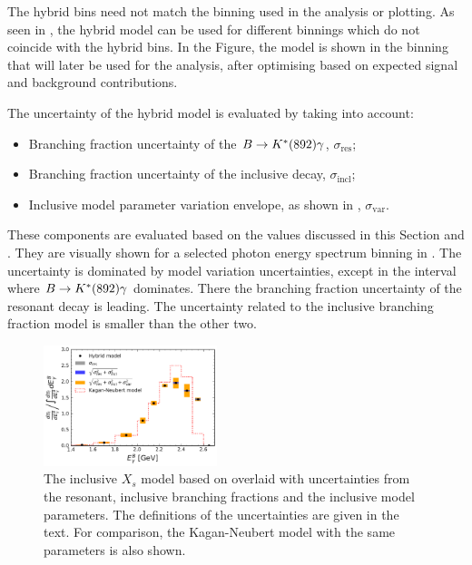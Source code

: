 The hybrid bins need not match the binning used in the analysis or plotting.
As seen in , the hybrid model can be used for different binnings which do not coincide with the hybrid bins.
In the Figure, the model is shown in the binning that will later be used for the analysis, after optimising based on expected signal and background contributions.

The uncertainty of the hybrid model is evaluated by taking into account:
\begin{itemize}
    \item Branching fraction uncertainty of the $B\rightarrow K^*(892)\gamma$, $\sigma_{\mathrm{res}}$;
    \item Branching fraction uncertainty of the inclusive \BtoXsgamma decay, $\sigma_{\mathrm{incl}}$;
    \item Inclusive model parameter variation envelope, as shown in , $\sigma_{\mathrm{var}}$.
\end{itemize}
These components are evaluated based on the values discussed in this Section and .
They are visually shown for a selected \BtoXsgamma photon energy spectrum binning in .
The uncertainty is dominated by \BtoXsgamma model variation uncertainties, except in the interval where $B\rightarrow K^*(892)\gamma$ dominates.
There the branching fraction uncertainty of the resonant decay is leading.
The uncertainty related to the \BtoXsgamma inclusive branching fraction model is smaller than the other two.
\begin{figure}[htbp!]
    \centering
    \includegraphics[width=0.45\textwidth]{figures/data_samples/hybrid_model_uncertainties.pdf}
    \caption{\label{fig:hybrid_uncertainty}The inclusive $X_s$ model based on 
    overlaid with uncertainties from the resonant, inclusive branching fractions and the inclusive model parameters.
    The definitions of the uncertainties are given in the text.
    For comparison, the Kagan-Neubert model with the same parameters is also shown.
    }
\end{figure}


